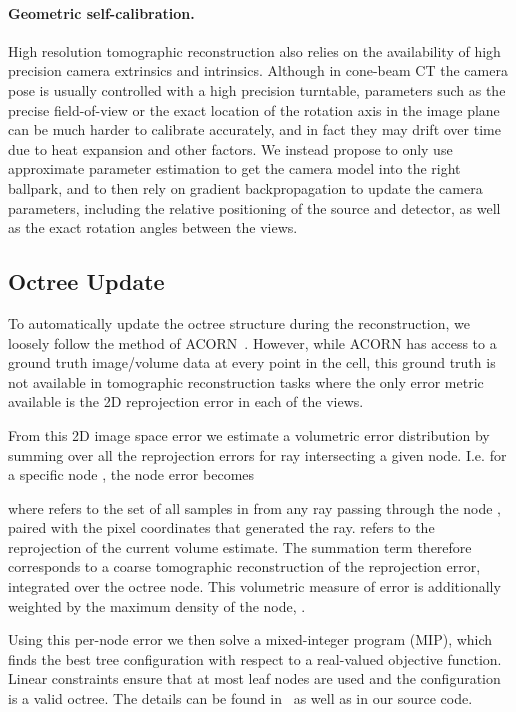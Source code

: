 \documentclass[acmtog,nonacm]{acmart} \acmSubmissionID{0438}
\begin{document}
\paragraph*{Geometric self-calibration.}
High resolution tomographic reconstruction also relies on the
availability of high precision camera extrinsics and
intrinsics. Although in cone-beam CT the camera pose is usually
controlled with a high precision turntable, parameters such as the
precise field-of-view or the exact location of the rotation axis in
the image plane can be much harder to calibrate accurately, and in
fact they may drift over time due to heat expansion and other
factors. We instead propose to only use approximate parameter
estimation to get the camera model into the right ballpark, and to
then rely on gradient backpropagation to update the camera parameters,
including the relative positioning of the source and detector, as well
as the exact rotation angles between the views.



\subsection{Octree Update}
\label{sec:octree_update}
To automatically update the octree structure during the
reconstruction, we loosely follow the method of
ACORN~\cite{martel2021acorn}. However, while ACORN has access to a ground
truth image/volume data at every point in the cell, this ground truth
is not available in tomographic reconstruction tasks where the only
error metric available is the 2D reprojection error in each of the
views.

From this 2D image space error we estimate a volumetric error
distribution by summing over all the reprojection errors for ray
intersecting a given node. I.e. for a specific node , the node
error becomes

where  refers to the set of all samples  in
 from any ray passing through the node , paired with the pixel
coordinates  that generated the ray.   refers to the
reprojection of the current volume estimate.  The summation term
therefore corresponds to a coarse tomographic reconstruction of the
reprojection error, integrated over the octree node. This volumetric
measure of error is additionally weighted by the maximum density of
the node, .

Using this per-node error we then solve a mixed-integer program (MIP), which finds the best tree configuration with respect to a real-valued objective function.  Linear constraints ensure that at most  leaf nodes are used and the configuration is a valid octree.
The details can be found in~\cite{martel2021acorn} as well as in our source code.
\end{document}
